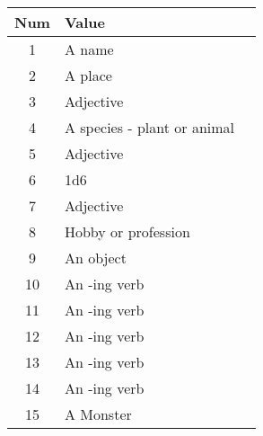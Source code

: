 \documentclass{article}
\begin{document}
\begin{table}[ht]
  \centering \Large
  \begin{tabularx}{\textwidth}{|c|X|p{8cm}|}
    \hline
    \textbf{Num} & \textbf{Value} & \\
    \hline
    1 & A name & \\ \midrule
    2 & A place & \\ \midrule
    3 & Adjective & \\ \midrule
    4 & A species - plant or animal & \\ \midrule
    5 & Adjective & \\ \midrule
    6 & 1d6 & \\ \midrule
    7 & Adjective & \\ \midrule
    8 & Hobby or profession & \\ \midrule
    9 & An object & \\ \midrule
    10 & An -ing verb & \\ \midrule
    11 & An -ing verb & \\ \midrule
    12 & An -ing verb & \\ \midrule
    13 & An -ing verb & \\ \midrule
    14 & An -ing verb & \\ \midrule
    15 & A Monster & \\
    \hline
  \end{tabularx}
\end{table}

\newpage
\end{document}

